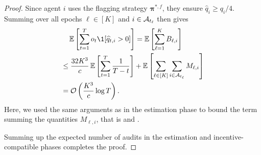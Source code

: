 \begin{proof}
Since agent $i$ uses the flagging strategy ${\bm\pi}^{\ast,f}$, they ensure $\hat q_i\geq q_i/4$. 
Summing over all epochs $\ell\in[K]$ and $i\in\mathcal{A}_{t_\ell}$ then gives
\begin{align*}
&\quad \E\sqb{\sum_{t=1}^T o_t \1[\hat q_{t,i}>0]}=\E\sqb{\sum_{\ell=1}^K B_{\ell,i}} \\
&\le \frac{32K^3}{c} \E\sqb{\sum_{t=1}^T \frac{1}{T-t} } + \E\sqb{\sum_{\ell\in[K]}\sum_{i\in\mA_{t_\ell}}M_{\ell,i}} \\
& =\mathcal O\paren{\frac{K^3}{c}\log T}.
\end{align*}
Here, we used the same arguments as in the estimation phase to bound the term summing the quantities $M_{\ell,i}$, that is  and .

Summing up the expected number of audits in the estimation and incentive-compatible phases completes the proof.
\end{proof}

